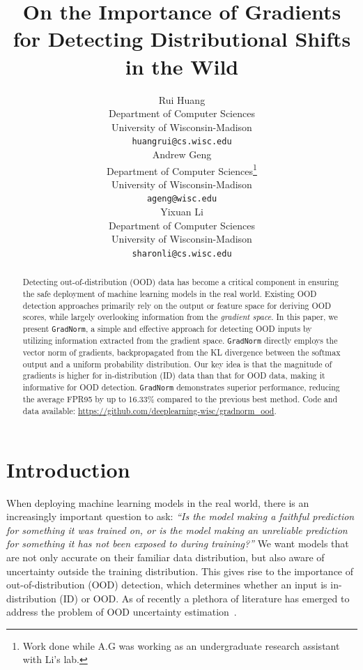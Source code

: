 \documentclass{article}
\title{On the Importance of Gradients for Detecting Distributional Shifts in the Wild}
\author{%
  Rui Huang \\
  Department of Computer Sciences\\
  University of Wisconsin-Madison\\
  \texttt{huangrui@cs.wisc.edu} \\
  \And 
  Andrew Geng \\
  Department of Computer Sciences\thanks{Work done while A.G was working as an undergraduate research assistant with Li's lab.}\\
  University of Wisconsin-Madison\\
  \texttt{ageng@wisc.edu} \\
  \And
  Yixuan Li \\
  Department of Computer Sciences\\
  University of Wisconsin-Madison\\
  \texttt{sharonli@cs.wisc.edu} \\
}
\newcommand{\SL}[1]{{\color{blue}[\textbf{Sharon}: #1]}}
\begin{document}
\maketitle


\begin{abstract}
Detecting out-of-distribution (OOD) data has become a critical component in ensuring the safe deployment of machine learning models in the real world. 
Existing OOD detection approaches primarily rely on the output or feature space for deriving OOD scores, while largely overlooking information from the \emph{gradient space}.
In this paper, we present \texttt{GradNorm}, a simple and effective approach for detecting OOD inputs by utilizing information extracted from the gradient space. \texttt{GradNorm} directly employs the vector norm of gradients, backpropagated from the KL divergence between the softmax output and a uniform probability distribution. Our key idea is that the magnitude of gradients is higher for in-distribution (ID) data than that for OOD data, making it informative for OOD detection. \texttt{GradNorm} demonstrates superior performance, reducing the average FPR95 by up to {16.33\%} compared to the previous best method. Code and data available: \url{https://github.com/deeplearning-wisc/gradnorm\_ood}.
\end{abstract}

\vspace{-\baselineskip}
\section{Introduction}

When deploying machine learning models in the real world, there is an increasingly important question to ask: \emph{``Is the model making a faithful prediction for something it was trained on, or is the model making an unreliable prediction for something it has not been exposed to during training?''} We want models that are not only accurate on their familiar data distribution, but also aware of uncertainty outside the training distribution. 
This gives rise to the importance of out-of-distribution (OOD) detection, which determines whether an input is in-distribution (ID) or OOD. As of recently a plethora of literature has emerged to address the problem of OOD uncertainty estimation~\cite{chen2021robustifying, hendrycks2016baseline, hsu2020generalized, huang2021mos, lakshminarayanan2017simple, lee2018simple, liang2018enhancing, lin2021mood, liu2020energy,  mohseni2020self, nalisnick2018deep}.
\end{document}
